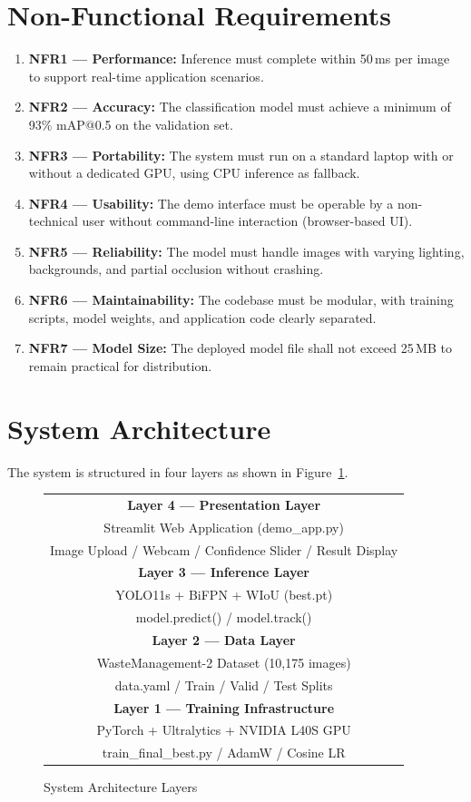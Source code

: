\section{Non-Functional Requirements}

\begin{enumerate}
    \item \textbf{NFR1 — Performance:} Inference must complete within 50\,ms per image to support real-time application scenarios.
    \item \textbf{NFR2 — Accuracy:} The classification model must achieve a minimum of 93\% mAP@0.5 on the validation set.
    \item \textbf{NFR3 — Portability:} The system must run on a standard laptop with or without a dedicated GPU, using CPU inference as fallback.
    \item \textbf{NFR4 — Usability:} The demo interface must be operable by a non-technical user without command-line interaction (browser-based UI).
    \item \textbf{NFR5 — Reliability:} The model must handle images with varying lighting, backgrounds, and partial occlusion without crashing.
    \item \textbf{NFR6 — Maintainability:} The codebase must be modular, with training scripts, model weights, and application code clearly separated.
    \item \textbf{NFR7 — Model Size:} The deployed model file shall not exceed 25\,MB to remain practical for distribution.
\end{enumerate}

\section{System Architecture}

The system is structured in four layers as shown in Figure~\ref{fig:sysarch}.

\begin{figure}[H]
\centering
\begin{tabular}{|c|}
\hline
\textbf{Layer 4 — Presentation Layer} \\
Streamlit Web Application (demo\_app.py) \\
Image Upload / Webcam / Confidence Slider / Result Display \\
\hline
\textbf{Layer 3 — Inference Layer} \\
YOLO11s + BiFPN + WIoU (best.pt) \\
model.predict() / model.track() \\
\hline
\textbf{Layer 2 — Data Layer} \\
WasteManagement-2 Dataset (10,175 images) \\
data.yaml / Train / Valid / Test Splits \\
\hline
\textbf{Layer 1 — Training Infrastructure} \\
PyTorch + Ultralytics + NVIDIA L40S GPU \\
train\_final\_best.py / AdamW / Cosine LR \\
\hline
\end{tabular}
\caption{System Architecture Layers}
\label{fig:sysarch}
\end{figure}

